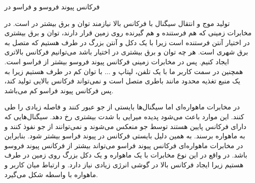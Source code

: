 \SubProblem
{فرکانس پیوند فروسو و فراسو در }
{
تولید موج و انتقال سیگنال با فرکانس بالا نیازمند توان و برق بیشتر در
است. 
در مخابرات زمینی که هم فرستنده و هم گیرنده روی زمین قرار دارند، توان و برق بیشتری در اختیار آنتن فرستنده است زیرا با یک دکل و آنتن بزرگ در طرف هستیم که متصل به برق شهری است. هر چه توان و برق بیشتری در اختیار باشد می‌توانیم فرکانس بالاتری ایجاد کنیم. پس در مخابرات زمینی فرکانس پیوند فروسو بیشتر از فراسو است. همچنین در سمت کاربر ما با یک تلفن، لپتاپ و ... با توان کم در طرف هستیم زیرا به یک منبع تغذیه محدود مانند باطری متصل است و نمی‌تواند فرکانس بالایی تولید کند، پس فرکانس پیوند فراسو کم می‌باشد.

در مخابرات ماهواره‌ای اما سیگنال‌ها بایستی از جو عبور کنند و فاصله زیادی را طی کنند. این موارد باعث می‌شود پدیده میرایی با شدت بیشتری رخ دهد. سیگنال‌هایی که دارای فرکانس پایین هستند توسط جو منعکس می‌شوند و نمی‌توانند از جو نفوذ کنند و به ماهواره برسند. به همین دلیل بایستی فرکانس در پیوند فراسو بیشتر شود.
بنابراین در مخابرات ماهواره‌ای فرکانس پیوند فراسو می‌تواند بیشتر از فرکانس پیوند فروسو باشد.
در واقع در این نوع مخابرات با یک ماهواره و یک دکل بزرگ روی زمین در طرف هستیم زیرا ایجاد فرکانس بالا در گوشی انرژی زیادی نیاز دارد. و ارتباط میان کاربر و ماهواره با واسطه شکل می‌گیرد.
}
